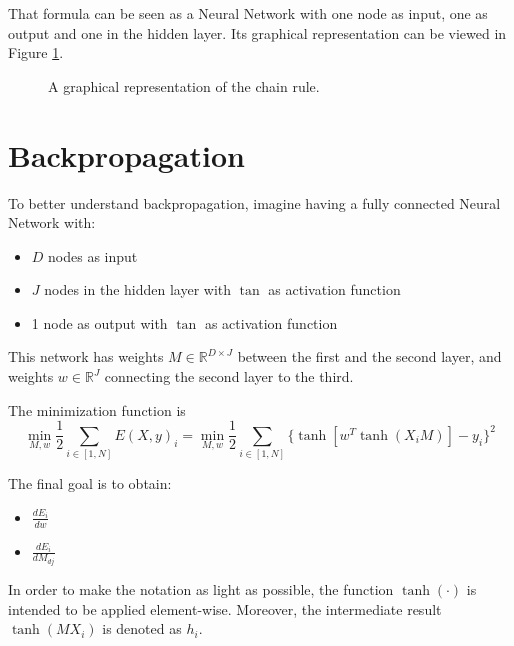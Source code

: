 That formula can be seen as a Neural Network with one node as input, one as output and one in the hidden layer.
Its graphical representation can be viewed in Figure \ref{fig:nn-chain}.

\begin{figure}[h]
    \centering
    \caption{A graphical representation of the chain rule.}
    \label{fig:nn-chain}
\end{figure}

\section{Backpropagation}
To better understand backpropagation, imagine having a fully connected Neural Network with:
\begin{itemize}
    \item $D$ nodes as input
    \item $J$ nodes in the hidden layer with $\tan$ as activation function
    \item 1 node as output with $\tan$ as activation function
\end{itemize}

This network has weights $M \in \mathbb{R}^{D \times J}$ between the first and the second layer,
and weights $w \in \mathbb{R}^{J} $ connecting the second layer to the third.

The minimization function is
$$\displaystyle \min_{M, w} \frac{1}{2} \sum_{i \in [1, N]} E(X, y)_i =
    \min_{M, w} \frac{1}{2} \sum_{i \in [1, N]} \{ \tanh[w^T \tanh(X_i M)] - y_i\}^2 $$

The final goal is to obtain:
\begin{multicols}{2}
    \begin{itemize}
        \item $\displaystyle \frac{dE_i}{dw}$
        \item $\displaystyle \frac{dE_i}{dM_{dj}}$
    \end{itemize}
\end{multicols}

In order to make the notation as light as possible, the function $\tanh(\cdot)$ is intended to be applied element-wise.
Moreover, the intermediate result $\tanh(M X_i)$ is denoted as $h_i$.

